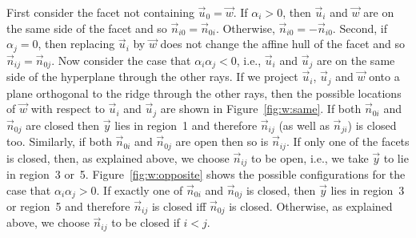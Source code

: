 First consider the facet not containing $\vec u_0 = \vec w$.
If $\alpha_i > 0$, then $\vec u_i$ and $\vec w$ are on the same side of the facet
and so $\vec n_{i0} = \vec n_{0i}$.  Otherwise, $\vec n_{i0} = -\vec n_{i0}$.
Second, if $\alpha_j = 0$, then replacing $\vec u_i$ by $\vec w$ does not
change the affine hull of the facet and so $\vec n_{ij} = \vec n_{0j}$.
Now consider the case that $\alpha_i \alpha_j < 0$, i.e., $\vec u_i$
and $\vec u_j$ are on the same side of the hyperplane through the other rays.
If we project $\vec u_i$, $\vec u_j$ and $\vec w$ onto a plane orthogonal
to the ridge through the other rays, then the possible locations of $\vec w$
with respect to $\vec u_i$ and $\vec u_j$ are shown in Figure~\ref{fig:w:same}.
If both $\vec n_{0i}$ and $\vec n_{0j}$ are closed then $\vec y$ lies in region~1
and therefore $\vec n_{ij}$ (as well as $\vec n_{ji}$) is closed too.
Similarly, if both $\vec n_{0i}$ and $\vec n_{0j}$ are open then so is
$\vec n_{ij}$.  If only one of the facets is closed, then, as explained above,
we choose $\vec n_{ij}$ to be open, i.e., we take $\vec y$ to lie in region~3
or~5.
Figure~\ref{fig:w:opposite} shows the possible configurations
for the case that $\alpha_i \alpha_j > 0$.
If exactly one of $\vec n_{0i}$ and $\vec n_{0j}$ is closed, then
$\vec y$ lies in region~3 or region~5 and therefore $\vec n_{ij}$ is closed iff
$\vec n_{0j}$ is closed.
Otherwise, as explained above, we choose $\vec n_{ij}$ to be closed if $i < j$.

